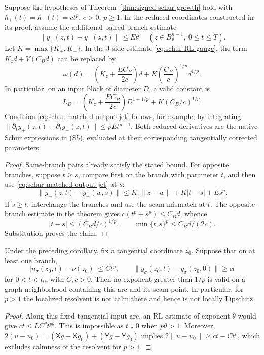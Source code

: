 \begin{proposition}
\label{prop:schur-matched-jet}
Suppose the hypotheses of Theorem~\ref{thm:signed-schur-growth} hold
with \(h_+(t)=h_-(t)=ct^p\), \(c>0\), \(p\ge1\).
In the reduced coordinates constructed in its proof, assume the
additional paired-branch estimate
\[
 \|y_+(z,t)-y_-(z,t)\|\le Et^p
 \quad(z\in B_r^{n-1},\ 0\le t\le T).
 \tag{S16}\label{eq:schur-matched-output-jet}
\]
Let \(K=\max\{K_+,K_-\}\).  In the J-side estimate
\eqref{eq:schur-RL-gauge}, the term \(K_zd+V(C_Bd)\) can be replaced by
\[
 \omega(d)=\left(K_z+\frac{EC_B}{2c}\right)d
       +K\left(\frac{C_B}{c}\right)^{1/p}d^{1/p}.
 \tag{S17}\label{eq:schur-matched-modulus}
\]
In particular, on an input block of diameter \(D\), a valid constant is
\[
 L_D=\left(K_z+\frac{EC_B}{2c}\right)D^{1-1/p}
           +K(C_B/c)^{1/p}.
\]
Condition \eqref{eq:schur-matched-output-jet} follows, for example,
by integrating
\(\|\partial_ty_+(z,t)-\partial_ty_-(z,t)\|\le pEt^{p-1}\).
Both reduced derivatives are the native Schur expressions in (S5),
evaluated at their corresponding tangentially corrected parameters.
\end{proposition}
\begin{proof}
Same-branch pairs already satisfy the stated bound.  For opposite
branches, suppose \(t\ge s\), compare first on the branch with parameter
\(t\), and then use \eqref{eq:schur-matched-output-jet} at \(s\):
\[
 \|y_+(z,t)-y_-(w,s)\|
 \le K_z\|z-w\|+K|t-s|+Es^p.
\]
If \(s\ge t\), interchange the branches and use the seam mismatch at
\(t\).  The opposite-branch estimate in the theorem gives
\(c(t^p+s^p)\le C_Bd\), whence
\[
 |t-s|\le(C_Bd/c)^{1/p},\qquad
 \min\{t,s\}^p\le C_Bd/(2c).
\]
Substitution proves the claim.
\end{proof}

\begin{proposition}
\label{prop:schur-sharp-exponent}
Under the preceding corollary, fix a tangential coordinate \(z_0\).
Suppose that on at least one branch,
\[
 |n_\sigma(z_0,t)-\nu(z_0)|\le Ct^p,\qquad
 \|y_\sigma(z_0,t)-y_\sigma(z_0,0)\|\ge ct
\]
for \(0<t<t_0\), with \(C,c>0\).  Then no exponent greater than
\(1/p\) is valid on a graph neighborhood containing this arc and its
seam point.  In particular, for \(p>1\) the localized resolvent is not
calm there and hence is not locally Lipschitz.
\end{proposition}
\begin{proof}
Along this fixed tangential-input arc, an RL estimate of exponent
\(\theta\) would give \(ct\le LC^\theta t^{p\theta}\).
This is impossible as \(t\downarrow0\) when \(p\theta>1\).  Moreover,
\(2(u-u_0)=(\mathsf Xg-\mathsf Xg_0)+(\mathsf Yg-\mathsf Yg_0)\)
implies \(2\|u-u_0\|\ge ct-Ct^p\), which excludes calmness of the
resolvent for \(p>1\).
\end{proof}

